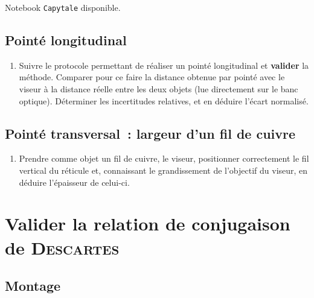 \documentclass[../main/main.tex]{subfiles}
\begin{document}
Notebook \texttt{Capytale}
disponible.

\subsection{Pointé longitudinal}

\begin{enumerate}[label=\sqenumi, start=3]
	\item Suivre le protocole permettant de réaliser un pointé longitudinal et
	      \textbf{valider} la méthode. Comparer pour ce faire la distance obtenue
	      par pointé avec le viseur à la distance réelle entre les deux objets
	      (lue directement sur le banc optique). Déterminer les incertitudes
	      relatives, et en déduire l'écart normalisé.
\end{enumerate}

\subsection{Pointé transversal~: largeur d'un fil de cuivre}

\begin{enumerate}[label=\sqenumi, start=4]
	\item Prendre comme objet un fil de cuivre, le viseur, positionner
	      correctement le fil vertical du réticule et, connaissant le grandissement de
	      l'objectif du viseur, en déduire l'épaisseur de celui-ci.
\end{enumerate}

%

\section{Valider la relation de conjugaison de \textsc{Descartes}}

\subsection{Montage}
\end{document}

